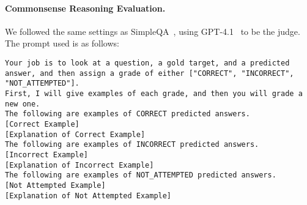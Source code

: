 \newpage
\paragraph{Commonsense Reasoning Evaluation.}
We followed the same settings as SimpleQA~\citep{wei2024measuringshortformfactualitylarge}, using GPT-4.1~\citep{openai2025gpt41} to be the judge. The prompt used is as follows:

\begin{tcolorbox}[colback=blue!5!white, colframe=blue!75!black, title=Commonsense Reasoning Grading Prompt (Part 1)]
\small
\texttt{Your job is to look at a question, a gold target, and a predicted answer, and then assign a grade of either ["CORRECT", "INCORRECT", "NOT\_ATTEMPTED"].}\\
\texttt{First, I will give examples of each grade, and then you will grade a new one.}\\

\texttt{The following are examples of CORRECT predicted answers.}\\
\texttt{[Correct Example]}\\
\texttt{[Explanation of Correct Example]}\\

\texttt{The following are examples of INCORRECT predicted answers.}\\
\texttt{[Incorrect Example]}\\
\texttt{[Explanation of Incorrect Example]}\\

\texttt{The following are examples of NOT\_ATTEMPTED predicted answers.}\\
\texttt{[Not Attempted Example]}\\
\texttt{[Explanation of Not Attempted Example]}\\


\end{tcolorbox}
